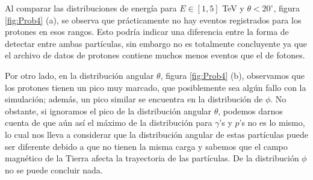 \documentclass[11pt]{article}
\begin{document}
Al comparar las distribuciones de energía para $E\in[1, 5]$ TeV y $\theta<20^{\circ}$, figura \ref{fig:Prob4} (a), se observa que prácticamente no hay eventos registrados para los protones en esos rangos. Esto podría indicar una diferencia entre la forma de detectar entre ambas partículas, sin embargo no es totalmente concluyente ya que el archivo de datos de protones contiene muchos menos eventos que el de fotones. 

\hspace{5mm}Por otro lado, en la distribución angular $\theta$, figura \ref{fig:Prob4} (b), observamos que los protones tienen un pico muy marcado, que posiblemente sea algún fallo con la simulación; además, un pico similar se encuentra en la distribución de $\phi$. No obstante, si ignoramos el pico de la distribución angular $\theta$, podemos darnos cuenta de que aún así el máximo de la distribución para $\gamma$'s y $p$'s no es lo mismo, lo cual nos lleva a considerar que la distribución angular de estas partículas puede ser diferente debido a que no tienen la misma carga y sabemos que el campo magnético de la Tierra afecta la trayectoria de las partículas. De la distribución $\phi$ no se puede concluir nada. 
\end{document}
